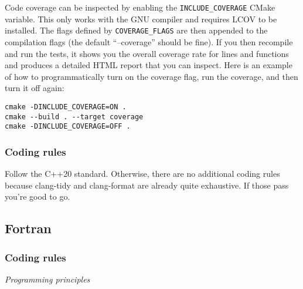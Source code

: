 \documentclass{article}
\begin{document}
Code coverage can be inspected by enabling the \verb+INCLUDE_COVERAGE+ CMake variable. This only works with the GNU compiler and requires LCOV to be installed. The flags defined by \verb+COVERAGE_FLAGS+ are then appended to the compilation flags (the default ``--coverage'' should be fine). If you then recompile and run the tests, it shows you the overall coverage rate for lines and functions and produces a detailed HTML report that you can inspect. Here is an example of how to programmatically turn on the coverage flag, run the coverage, and then turn it off again:
\begin{verbatim}
cmake -DINCLUDE_COVERAGE=ON .
cmake --build . --target coverage
cmake -DINCLUDE_COVERAGE=OFF .
\end{verbatim}

\subsubsection{Coding rules}

Follow the C++20 standard. Otherwise, there are no additional coding rules because clang-tidy and clang-format are already quite exhaustive. If those pass you're good to go.

\subsection{Fortran}

\subsubsection{Coding rules}

\textit{Programming principles}
\end{document}
